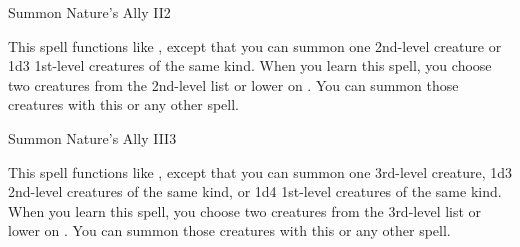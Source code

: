 \begin{spellsection}{Summon Nature's Ally II}{2}
    \begin{spellheader}
    \end{spellheader}
    \begin{spellcontent}
        \begin{spelltargetinginfo}
        \end{spelltargetinginfo}
        \begin{spelleffects}
            \spellspecial This spell functions like , except that you can summon one 2nd-level creature or 1d3 1st-level creatures of the same kind. When you learn this spell, you choose two creatures from the 2nd-level list or lower on . You can summon those creatures with this or any other  spell.
            \spelldur \durshort \dismissable
        \end{spelleffects}
    \end{spellcontent}
    \begin{spellfooter}
        \miscastexplode
    \end{spellfooter}
\end{spellsection}

\begin{spellsection}{Summon Nature's Ally III}{3}
    \begin{spellheader}
    \end{spellheader}
    \begin{spellcontent}
        \begin{spelltargetinginfo}
        \end{spelltargetinginfo}
        \begin{spelleffects}
            \spellspecial This spell functions like , except that you can summon one 3rd-level creature, 1d3 2nd-level creatures of the same kind, or 1d4 1st-level creatures of the same kind. When you learn this spell, you choose two creatures from the 3rd-level list or lower on . You can summon those creatures with this or any other  spell.
            \spelldur \durshort \dismissable
        \end{spelleffects}
    \end{spellcontent}
    \begin{spellfooter}
        \miscastexplode
    \end{spellfooter}
\end{spellsection}

